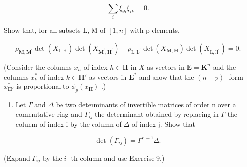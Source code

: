 \[
\sum_ {i} \xi_ {i h} \xi_ {i k} = 0.
\]

Show that, for all subsets L, M of \([1, n]\) with p elements,

\[
\rho_ {\mathbf {M}, \mathbf {M} ^ {\prime}} \det (X _ {\mathrm{L}, \mathrm{H}}) \det (X _ {\mathbf {M} ^ {\prime}, \mathbf {H} ^ {\prime}}) - \rho_ {\mathrm{L}, \mathrm{L} ^ {\prime}} \det (X _ {\mathbf {M}, \mathbf {H}}) \det (X _ {\mathrm{L}, \mathrm{H} ^ {\prime}}) = 0.
\]

(Consider the columns \(x_h\) of index \(h \in \mathbf{H}\) in \(X\) as vectors in \(\mathbf{E} = \mathbf{K}^n\) and the columns \(x_k^*\) of index \(k \in \mathbf{H}'\) as vectors in \(\mathbf{E}^*\) and show that the \((n - p)\) -form \(x_{\mathbf{H}'}^*\) is proportional to \(\phi_p(x_{\mathbf{H}})\) .)

\begin{enumerate}
\def\labelenumi{\arabic{enumi}.}
\setcounter{enumi}{12}
\tightlist
\item
  Let \(\Gamma\) and \(\Delta\) be two determinants of invertible matrices of order n over a commutative ring and \(\Gamma_{ij}\) the determinant obtained by replacing in \(\Gamma\) the column of index i by the column of \(\Delta\) of index j. Show that
\end{enumerate}

\[
\det (\Gamma_ {i j}) = \Gamma^ {n - 1} \Delta .
\]

(Expand \(\Gamma_{ij}\) by the \(i\) -th column and use Exercise 9.)

